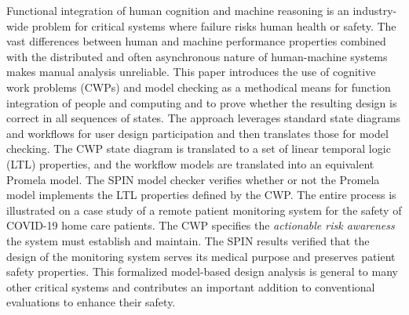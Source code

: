 Functional integration of human cognition and machine reasoning is an industry-wide problem for critical systems where failure risks human health or safety. The vast differences between human and machine performance properties combined with the distributed and often asynchronous nature of human-machine systems makes manual analysis unreliable. This paper introduces the use of cognitive work problems (CWPs) and model checking as a methodical means for function integration of people and computing and to prove whether the resulting design is correct in all sequences of states. The approach leverages standard state diagrams and workflows for user design participation and then translates those for model checking. The CWP state diagram is translated to a set of linear temporal logic (LTL) properties, and the workflow models are translated into an equivalent Promela model. The SPIN model checker verifies whether or not the Promela model implements the LTL properties defined by the CWP. The entire process is illustrated on a case study of a remote patient monitoring system for the safety of COVID-19 home care patients. The CWP specifies the \emph{actionable risk awareness} the system must establish and maintain. The SPIN results verified that the design of the monitoring system serves its medical purpose and preserves patient safety properties. This formalized model-based design analysis is general to many other critical systems and contributes an important addition to conventional evaluations to enhance their safety.

\begin{comment}
Remote health-care that integrates human and machine intelligence for patient monitoring is an active area of research. These systems must take extra precautions for safety since the patients are not in the direct supervision of medical providers. This paper details the application of model checking to the Bionous \phware\ remote patient monitoring system to prove it preserves patient safety properties. Patient safety requirements are formalized in a cognitive work problem that is translated to Linear Temporal Logic properties. A cognitive work problem (CWP) is a computationally independent model stating what a system must accomplish. In this example, the system must take action on risk awareness to enhance patient safety, so the CWP defines risk awareness and requisite decisions given the current risk. The \phware\ workflow is translated to Promela to model the asynchronous behaviors of the patient at home, the artificial intelligence in the cloud, and the clinicians. The LTL and Promela models with added behaviors for patient severity are given to the SPIN model checker to prove the system implements the cognitive work problem, meaning it acts appropriately in regards to risk awareness. This result is an important contribution to conventional evaluations and contributes to the assurance of patient safety in remote health IT.
\end{comment}